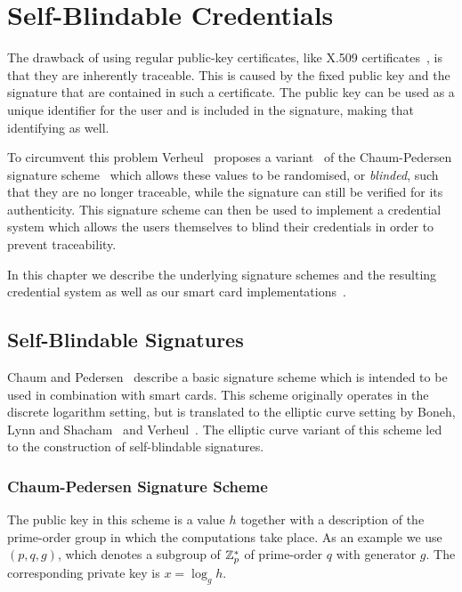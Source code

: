 \chapter{Self-Blindable Credentials}

The drawback of using regular public-key certificates, like X.509
certificates~\cite{ISO9594-8}, is that they are inherently traceable. This is
caused by the fixed public key and the signature that are contained in such a
certificate. The public key can be used as a unique identifier for the user and
is included in the signature, making that identifying as well.

To circumvent this problem Verheul~\cite{Verheul01} proposes a
variant~\cite{BonehLS01,BonehLS04} of the Chaum-Pedersen signature
scheme~\cite{ChaumPedersen93} which allows these values to be randomised, or
\emph{blinded}, such that they are no longer traceable, while the signature can
still be verified for its authenticity. This signature scheme can then be used
to implement a credential system which allows the users themselves to blind
their credentials in order to prevent traceability.

In this chapter we describe the underlying signature schemes and the resulting
credential system as well as our smart card
implementations~\cite{BatinaHJMV10,HoepmanJV10}.

\section{Self-Blindable Signatures}

Chaum and Pedersen~\cite{ChaumPedersen93} describe a basic signature scheme
which is intended to be used in combination with smart cards. This scheme
originally operates in the discrete logarithm setting, but is translated to the
elliptic curve setting by Boneh, Lynn and Shacham~\cite{BonehLS01,BonehLS04}
and Verheul~\cite{Verheul01}. The elliptic curve variant of this scheme led to
the construction of self-blindable signatures.

\subsection{Chaum-Pedersen Signature Scheme}

The public key in this scheme is a value $h$ together with a description of the
prime-order group in which the computations take place. As an example we use
$(p, q, g)$, which denotes a subgroup of $\mathbb{Z}^*_p$ of prime-order $q$ with
generator $g$. The corresponding private key is $x = \log_g h$.

